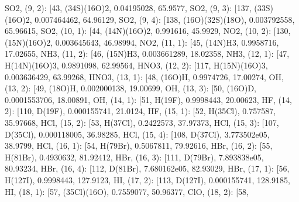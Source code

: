 \documentclass[letterpaper,10pt,english]{sphinxmanual}
\begin{document}
\begin{fulllineitems}
\textquotesingle{}SO2\textquotesingle{}{]}, (9, 2): {[}43, \textquotesingle{}(34S)(16O)2\textquotesingle{}, 0.04195028, 65.9577, \textquotesingle{}SO2\textquotesingle{}{]}, (9, 3): {[}137, \textquotesingle{}(33S)(16O)2\textquotesingle{}, 0.007464462, 64.96129, \textquotesingle{}SO2\textquotesingle{}{]}, (9, 4): {[}138, \textquotesingle{}(16O)(32S)(18O)\textquotesingle{}, 0.003792558, 65.96615, \textquotesingle{}SO2\textquotesingle{}{]}, (10, 1): {[}44, \textquotesingle{}(14N)(16O)2\textquotesingle{}, 0.991616, 45.9929, \textquotesingle{}NO2\textquotesingle{}{]}, (10, 2): {[}130, \textquotesingle{}(15N)(16O)2\textquotesingle{}, 0.003645643, 46.98994, \textquotesingle{}NO2\textquotesingle{}{]}, (11, 1): {[}45, \textquotesingle{}(14N)H3\textquotesingle{}, 0.9958716, 17.02655, \textquotesingle{}NH3\textquotesingle{}{]}, (11, 2): {[}46, \textquotesingle{}(15N)H3\textquotesingle{}, 0.003661289, 18.02358, \textquotesingle{}NH3\textquotesingle{}{]}, (12, 1): {[}47, \textquotesingle{}H(14N)(16O)3\textquotesingle{}, 0.9891098, 62.99564, \textquotesingle{}HNO3\textquotesingle{}{]}, (12, 2): {[}117, \textquotesingle{}H(15N)(16O)3\textquotesingle{}, 0.003636429, 63.99268, \textquotesingle{}HNO3\textquotesingle{}{]}, (13, 1): {[}48, \textquotesingle{}(16O)H\textquotesingle{}, 0.9974726, 17.00274, \textquotesingle{}OH\textquotesingle{}{]}, (13, 2): {[}49, \textquotesingle{}(18O)H\textquotesingle{}, 0.002000138, 19.00699, \textquotesingle{}OH\textquotesingle{}{]}, (13, 3): {[}50, \textquotesingle{}(16O)D\textquotesingle{}, 0.0001553706, 18.00891, \textquotesingle{}OH\textquotesingle{}{]}, (14, 1): {[}51, \textquotesingle{}H(19F)\textquotesingle{}, 0.9998443, 20.00623, \textquotesingle{}HF\textquotesingle{}{]}, (14, 2): {[}110, \textquotesingle{}D(19F)\textquotesingle{}, 0.000155741, 21.0124, \textquotesingle{}HF\textquotesingle{}{]}, (15, 1): {[}52, \textquotesingle{}H(35Cl)\textquotesingle{}, 0.757587, 35.97668, \textquotesingle{}HCl\textquotesingle{}{]}, (15, 2): {[}53, \textquotesingle{}H(37Cl)\textquotesingle{}, 0.2422573, 37.97373, \textquotesingle{}HCl\textquotesingle{}{]}, (15, 3): {[}107, \textquotesingle{}D(35Cl)\textquotesingle{}, 0.000118005, 36.98285, \textquotesingle{}HCl\textquotesingle{}{]}, (15, 4): {[}108, \textquotesingle{}D(37Cl)\textquotesingle{}, 3.773502e\sphinxhyphen{}05, 38.9799, \textquotesingle{}HCl\textquotesingle{}{]}, (16, 1): {[}54, \textquotesingle{}H(79Br)\textquotesingle{}, 0.5067811, 79.92616, \textquotesingle{}HBr\textquotesingle{}{]}, (16, 2): {[}55, \textquotesingle{}H(81Br)\textquotesingle{}, 0.4930632, 81.92412, \textquotesingle{}HBr\textquotesingle{}{]}, (16, 3): {[}111, \textquotesingle{}D(79Br)\textquotesingle{}, 7.893838e\sphinxhyphen{}05, 80.93234, \textquotesingle{}HBr\textquotesingle{}{]}, (16, 4): {[}112, \textquotesingle{}D(81Br)\textquotesingle{}, 7.680162e\sphinxhyphen{}05, 82.93029, \textquotesingle{}HBr\textquotesingle{}{]}, (17, 1): {[}56, \textquotesingle{}H(127I)\textquotesingle{}, 0.9998443, 127.9123, \textquotesingle{}HI\textquotesingle{}{]}, (17, 2): {[}113, \textquotesingle{}D(127I)\textquotesingle{}, 0.000155741, 128.9185, \textquotesingle{}HI\textquotesingle{}{]}, (18, 1): {[}57, \textquotesingle{}(35Cl)(16O)\textquotesingle{}, 0.7559077, 50.96377, \textquotesingle{}ClO\textquotesingle{}{]}, (18, 2): {[}58, 
\end{fulllineitems}
\end{document}
